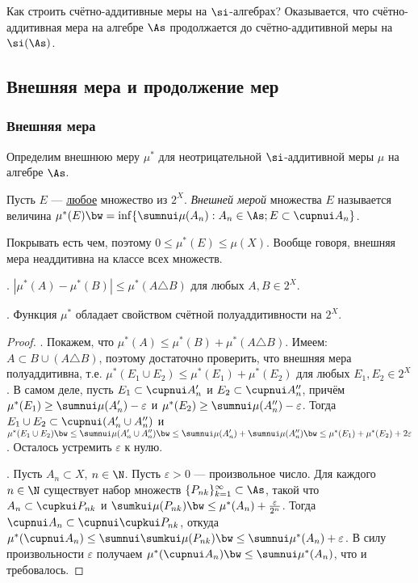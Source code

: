 \documentclass[10pt]{article}
\newcommand{\ve}{\varepsilon}
\begin{document}
Как строить счётно-аддитивные меры на $\si$-алгебрах? Оказывается,
что счётно-аддитивная мера на алгебре $\As$ продолжается до
счётно-аддитивной меры на $\si(\As)$.

\subsection{Внешняя мера и продолжение мер}

\subsubsection{Внешняя мера}

Определим внешнюю меру $\mu^*$ для неотрицательной $\si$-аддитивной
меры $\mu$ на алгебре $\As$.

\begin{df}
Пусть $E$ --- \underline{любое} множество из $2^X$. \emph{Внешней
мерой} множества $E$ называется величина $\mu^*(E)\bw
=\inf\{\sumnui\mu(A_n): A_n\in\As; E\subset\cupnui A_n\}$.
\end{df}
Покрывать есть чем, поэтому $0\le\mu^*(E)\le\mu(X)$. Вообще говоря,
внешняя мера неаддитивна на классе всех множеств.

\begin{lemma}\label{sym_diff}

. $|\mu^*(A)-\mu^*(B)|\le\mu^*(A\triangle B)$ для любых
$A,B\in 2^X$.

. Функция $\mu^*$ обладает свойством счётной полуаддитивности
на $2^X$.
\end{lemma}

\begin{proof}
. Покажем, что $\mu^*(A)\le\mu^*(B)+\mu^*(A\triangle B)$.
Имеем: $A\subset B\cup(A\triangle B)$, поэтому достаточно проверить,
что внешняя мера полуаддитивна, т.е. $\mu^*(E_1\cup
E_2)\le\mu^*(E_1)+\mu^*(E_2)$ для любых $E_1,E_2\in2^X$. В самом
деле, пусть $E_1\subset\cupnui A'_n$ и $E_2\subset\cupnui A''_n$,
причём $\mu^*(E_1)\ge\sumnui\mu(A'_n)-\ve$ и
$\mu^*(E_2)\ge\sumnui\mu(A''_n)-\ve$. Тогда $E_1\cup
E_2\subset\cupnui(A'_n\cup A''_n)$ и $\mu^*(E_1\cup E_2)\bw
\le\sumnui\mu(A'_n\cup A''_n)\bw
\le\sumnui\mu(A'_n)+\sumnui\mu(A''_n)\bw
\le\mu^*(E_1)+\mu^*(E_2)+2\ve$. Осталось устремить $\ve$ к нулю.

. Пусть $A_n\subset X$, $n\in\N$. Пусть $\ve>0$ ---
произвольное число. Для каждого $n\in\N$ существует набор множеств
$\{P_{nk}\}_{k=1}^\infty\subset\As$, такой что $A_n\subset\cupkui
P_{nk}$ и $\sumkui\mu(P_{nk})\bw \le\mu^*(A_n)+\frac{\ve}{2^n}$.
Тогда $\cupnui A_n\subset\cupnui\cupkui P_{nk}$, откуда
$\mu^*(\cupnui A_n)\le\sumnui\sumkui\mu(P_{nk})\bw
\le\sumnui\mu^*(A_n)+\ve$. В силу произвольности $\ve$ получаем
$\mu^*(\cupnui A_n)\bw \le\sumnui\mu^*(A_n)$, что и требовалось.
\end{proof}
\end{document}
